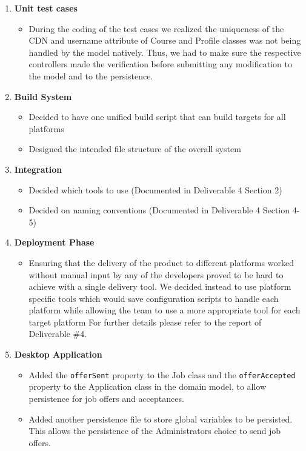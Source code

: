 \documentclass[12pt]{article}
\begin{document}
 \begin{enumerate}
     \item \textbf{Unit test cases}
     \begin{itemize}
        \item During the coding of the test cases we realized the uniqueness of the CDN and username attribute of Course and Profile classes was not being handled by the model natively. Thus, we had to make sure the respective controllers made the verification before submitting any modification to the model and to the persistence.
     \end{itemize}
     \item \textbf{Build System}
         \begin{itemize}
             \item Decided to have one unified build script that can build targets for all platforms
             \item Designed the intended file structure of the overall system
         \end{itemize}
    \item \textbf{Integration}
        \begin{itemize}
            \item Decided which tools to use (Documented in Deliverable 4 Section 2)
            \item Decided on naming conventions (Documented in Deliverable 4 Section 4-5)
        \end{itemize}
     \item \textbf{Deployment Phase}
     \begin{itemize}
        \item Ensuring that the delivery of the product to different platforms worked without manual input by any of the developers proved to be hard to achieve with a single delivery tool. We decided instead to use platform specific tools which would save configuration scripts to handle each platform while allowing the team to use a more appropriate tool for each target platform For further details please refer to the report of Deliverable \#4. 
     \end{itemize}
    \item \textbf{Desktop Application}
        \begin{itemize}
            \item Added the \texttt{offerSent} property to the Job class and the
                \texttt{offerAccepted} property to the Application class in the domain model, to
                allow persistence for job offers and acceptances.
            \item Added another persistence file to store global variables to be persisted. This
                allows the persistence of the Administrators choice to send job offers.
        \end{itemize}
 \end{enumerate}
\end{document}
